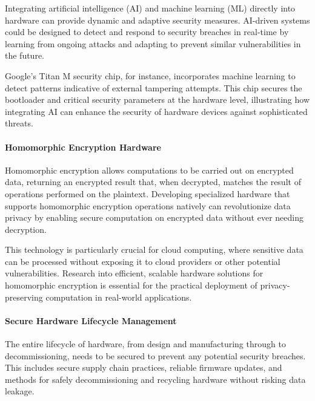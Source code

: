 Integrating artificial intelligence (AI) and machine learning (ML) directly into hardware can provide dynamic and adaptive security measures. AI-driven systems could be designed to detect and respond to security breaches in real-time by learning from ongoing attacks and adapting to prevent similar vulnerabilities in the future.

Google's Titan M security chip, for instance, incorporates machine learning to detect patterns indicative of external tampering attempts. This chip secures the bootloader and critical security parameters at the hardware level, illustrating how integrating AI can enhance the security of hardware devices against sophisticated threats.

\hypertarget{homomorphic-encryption-hardware}{%
\paragraph{Homomorphic Encryption
Hardware}\label{homomorphic-encryption-hardware}}

Homomorphic encryption allows computations to be carried out on encrypted data, returning an encrypted result that, when decrypted, matches the result of operations performed on the plaintext. Developing specialized hardware that supports homomorphic encryption operations natively can revolutionize data privacy by enabling secure computation on encrypted data without ever needing decryption.

This technology is particularly crucial for cloud computing, where sensitive data can be processed without exposing it to cloud providers or other potential vulnerabilities. Research into efficient, scalable hardware solutions for homomorphic encryption is essential for the practical deployment of privacy-preserving computation in real-world applications.\cite{gentryFULLYHOMOMORPHICENCRYPTION}

\hypertarget{secure-hardware-lifecycle-management}{%
\paragraph{Secure Hardware Lifecycle
Management}\label{secure-hardware-lifecycle-management}}

The entire lifecycle of hardware, from design and manufacturing through to decommissioning, needs to be secured to prevent any potential security breaches. This includes secure supply chain practices, reliable firmware updates, and methods for safely decommissioning and recycling hardware without risking data leakage.


